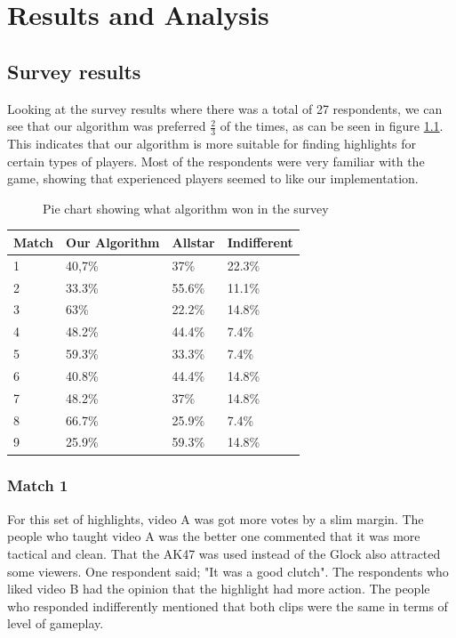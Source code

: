\chapter{Results and Analysis}
\label{chp:results}
\section{Survey results}
\label{chp:surveyResults}
Looking at the survey results where there was a total of 27 respondents, we can see that our algorithm was preferred $\frac{2}{3}$ of the times, as can be seen in figure \ref{fig:surveyOverall}. This indicates that our algorithm is more suitable for finding highlights for certain types of players. Most of the respondents were very familiar with the game, showing that experienced players seemed to like our implementation.
\begin{figure}
\centering
{}
\caption{Pie chart showing what algorithm won in the survey}
\label{fig:surveyOverall}
\end{figure}

\begin{table}[]
\begin{tabular}{|l|l|l|l|}
\hline
Match & Our Algorithm & Allstar & Indifferent \\ \hline
1     & 40,7\%        & 37\%    & 22.3\%      \\ \hline
2     & 33.3\%        & 55.6\%  & 11.1\%      \\ \hline
3     & 63\%          & 22.2\%  & 14.8\%      \\ \hline
4     & 48.2\%        & 44.4\%  & 7.4\%       \\ \hline
5     & 59.3\%        & 33.3\%  & 7.4\%       \\ \hline
6     & 40.8\%        & 44.4\%  & 14.8\%      \\ \hline
7     & 48.2\%        & 37\%    & 14.8\%      \\ \hline
8     & 66.7\%        & 25.9\%  & 7.4\%       \\ \hline
9     & 25.9\%        & 59.3\%  & 14.8\%      \\ \hline
\end{tabular}
\end{table}
\subsection*{Match 1}
For this set of highlights, video A was got more votes by a slim margin. The people who taught video A was the better one commented that it was more tactical and \gls{clean}. That the AK47 was used instead of the Glock also attracted some viewers. One respondent said; "It was a good clutch". The respondents who liked video B had the opinion that the highlight had more action. The people who responded indifferently mentioned that both clips were the same in terms of level of gameplay.

